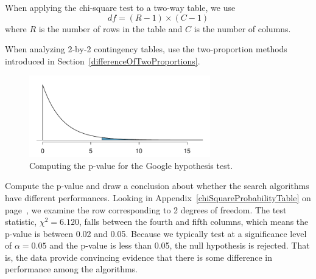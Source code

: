 \begin{termBox}{
When applying the chi-square test to a two-way table, we use
$$ df = (R-1)\times (C-1) $$
where $R$ is the number of rows in the table and $C$ is the number of columns.}
\end{termBox}

\begin{tipBox}{
When analyzing 2-by-2 contingency tables, use the two-proportion methods introduced in Section~\ref{differenceOfTwoProportions}.}
\end{tipBox}

\begin{figure}[h]
\centering
\includegraphics[width=0.7\textwidth]{ch_inference_for_props/figures/googleHTForDiffAlgPerformancePValue/googleHTForDiffAlgPerformancePValue}
\caption{Computing the p-value for the Google hypothesis test.}
\label{googleHTForDiffAlgPerformancePValue}
\end{figure}

\textC{\pagebreak}

\begin{example}{Compute the p-value and draw a conclusion about whether the search algorithms have different performances.}
Looking in Appendix~\ref{chiSquareProbabilityTable} on page~\pageref{chiSquareProbabilityTable}, we examine the row corresponding to 2 degrees of freedom. The test statistic, $\chi^2=6.120$, falls between the fourth and fifth columns, which means the p-value is between 0.02 and 0.05. Because we typically test at a significance level of $\alpha=0.05$ and the p-value is less than 0.05, the null hypothesis is rejected. That is, the data provide convincing evidence that there is some difference in performance among the algorithms.
\end{example}


